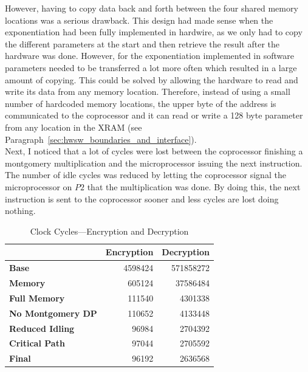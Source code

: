 \documentclass[a4paper]{article}
\begin{document}
However, having to copy data back and forth between the four shared memory locations was a serious drawback. This design had made sense when the exponentiation had been fully implemented in hardwire, as we only had to copy the different parameters at the start and then retrieve the result after the hardware was done. However, for the exponentiation implemented in software parameters needed to be transferred a lot more often which resulted in a large amount of copying. This could be solved by allowing the hardware to read and write its data from any memory location. Therefore, instead of using a small number of hardcoded memory locations, the upper byte of the address is communicated to the coprocessor and it can read or write a 128 byte parameter from any location in the XRAM (see Paragraph~\ref{sec:hwsw_boundaries_and_interface}).\\

Next, I noticed that a lot of cycles were lost between the coprocessor finishing a montgomery multiplication and the microprocessor issuing the next instruction. The number of idle cycles was reduced by letting the coprocessor signal the microprocessor on $P2$ that the multiplication was done. By doing this, the next instruction is sent to the coprocessor sooner and less cycles are lost doing nothing.\\

\begin{table}[H]
    \begin{center}	
        \begin{tabular}{l|r|r}
            & \textbf{Encryption} & \textbf{Decryption}\\\hline
            \textbf{Base} & 4598424 & 571858272\\
            \textbf{Memory} & 605124 & 37586484\\
            \textbf{Full Memory} & 111540 & 4301338\\
            \textbf{No Montgomery DP} & 110652 & 4133448\\
            \textbf{Reduced Idling} & 96984 & 2704392\\
            \textbf{Critical Path} & 97044 & 2705592\\
            \textbf{Final} & 96192 & 2636568
		\end{tabular}
	\end{center}
	\caption{Clock Cycles---Encryption and Decryption}
	\label{tab:clock_cycles_encryption_and_decryption}
\end{table}
\end{document}
